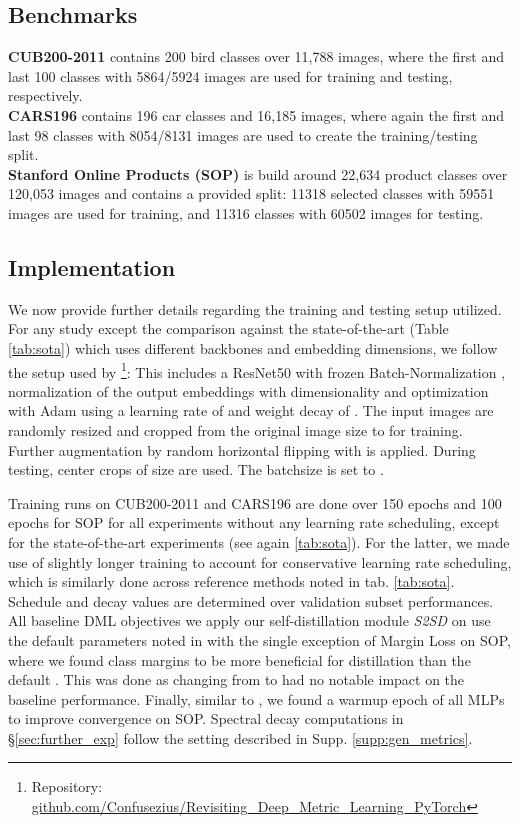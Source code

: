 \documentclass{article} \usepackage{arxiv_style,times}
\begin{document}
\subsection{Benchmarks}
\textbf{CUB200-2011} \citep{cub200-2011} contains 200 bird classes over 11,788 images, where the first and last 100 classes with 5864/5924 images are used for training and testing, respectively.\\ 
\textbf{CARS196} \citep{cars196} contains 196 car classes and 16,185 images, where again the first and last 98 classes with 8054/8131 images are used to create the training/testing split.\\ 
\textbf{Stanford Online Products (SOP)} \citep{lifted} is build around 22,634 product classes over 120,053 images and contains a provided split: 11318 selected classes with 59551 images are used for training, and 11316 classes with 60502 images for testing.
\subsection{Implementation}\label{supp:impl_dets}
We now provide further details regarding the training and testing setup utilized. For any study except the comparison against the state-of-the-art (Table \ref{tab:sota}) which uses different backbones and embedding dimensions, we follow the setup used by \cite{roth2020revisiting}\footnote{Repository: \url{github.com/Confusezius/Revisiting_Deep_Metric_Learning_PyTorch}}: This includes a ResNet50 \cite{resnet} with frozen Batch-Normalization \cite{batchnorm}, normalization of the output embeddings with dimensionality  and optimization with Adam \cite{adam} using a learning rate of  and weight decay of . The input images are randomly resized and cropped from the original image size to  for training. Further augmentation by random horizontal flipping with  is applied. During testing, center crops of size  are used. The batchsize is set to .

Training runs on CUB200-2011 and CARS196 are done over 150 epochs and 100 epochs for SOP for all experiments without any learning rate scheduling, except for the state-of-the-art experiments (see again \ref{tab:sota}). For the latter, we made use of slightly longer training to account for conservative learning rate scheduling, which is similarly done across reference methods noted in tab. \ref{tab:sota}. Schedule and decay values are determined over validation subset performances.
All baseline DML objectives we apply our self-distillation module \textit{S2SD} on use the default parameters noted in \cite{roth2020revisiting} with the single exception of Margin Loss on SOP, where we found class margins  to be more beneficial for distillation than the default . This was done as changing from  to  had no notable impact on the baseline performance.
Finally, similar to \cite{kim2020proxy}, we found a warmup epoch of all MLPs to improve convergence on SOP. Spectral decay computations in \S\ref{sec:further_exp} follow the setting described in Supp. \ref{supp:gen_metrics}.
\end{document}
